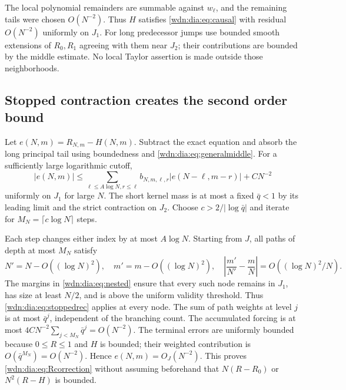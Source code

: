 \documentclass[11pt,letterpaper]{article}
\theoremstyle{remark}\newtheorem{remark}[theorem]{Remark}
\begin{document}
The local polynomial remainders are summable against $w_\ell$, and the
remaining tails were chosen $O(N^{-2})$. Thus $H$ satisfies
\eqref{wdn:dia:eq:causal} with residual $O(N^{-2})$ uniformly on $J_1$. For long
predecessor jumps use bounded smooth extensions of $R_0,R_1$ agreeing with
them near $J_2$; their contributions are bounded by the middle estimate.
No local Taylor assertion is made outside those neighborhoods.

\subsection{Stopped contraction creates the second order bound}
Let $e(N,m)=R_{N,m}-H(N,m)$. Subtract the exact equation and absorb the
long principal tail using boundedness and \eqref{wdn:dia:eq:generalmiddle}. For a
sufficiently large logarithmic cutoff,
\begin{equation}\label{wdn:dia:eq:stoppedrec}
 |e(N,m)|\le\sum_{\ell\le A\log N,r\le\ell}
 b_{N,m,\ell,r}|e(N-\ell,m-r)|+C N^{-2}
\end{equation}
uniformly on $J_1$ for large $N$. The short kernel mass is at most a fixed
$\bar q<1$ by its leading limit and the strict contraction on $J_2$.
Choose $c>2/|\log\bar q|$ and iterate for
$M_N=\lceil c\log N\rceil$ steps.

Each step changes either index by at most $A\log N$. Starting from $J$, all
paths of depth at most $M_N$ satisfy
\[
 N'=N-O((\log N)^2),\quad m'=m-O((\log N)^2),\quad
 \left|\frac{m'}{N'}-\frac mN\right|=O((\log N)^2/N).
\]
The margins in \eqref{wdn:dia:eq:nested} ensure that every such node remains in
$J_1$, has size at least $N/2$, and is above the uniform validity threshold.
Thus \eqref{wdn:dia:eq:stoppedrec} applies at every node. The sum of path weights at
level $j$ is at most $\bar q^j$, independent of the branching count. The
accumulated forcing is at most
$4CN^{-2}\sum_{j<M_N}\bar q^j=O(N^{-2})$. The terminal errors are uniformly
bounded because $0\le R\le1$ and $H$ is bounded; their weighted contribution
is $O(\bar q^{M_N})=O(N^{-2})$. Hence $e(N,m)=O_J(N^{-2})$.
This proves \eqref{wdn:dia:eq:Rcorrection} without assuming beforehand that
$N(R-R_0)$ or $N^2(R-H)$ is bounded.
\end{document}
